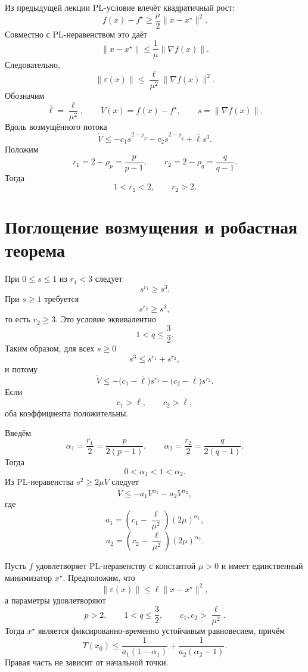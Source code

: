 Из предыдущей лекции PL-условие влечёт квадратичный рост:
\[
    f(x)-f^\star
    \ge
    \frac\mu2\lVert x-x^\star\rVert^2.
\]
Совместно с PL-неравенством это даёт
\[
    \lVert x-x^\star\rVert
    \le
    \frac1\mu\lVert\nabla f(x)\rVert.
\]
Следовательно,
\[
    \lVert\varepsilon(x)\rVert
    \le
    \frac\ell{\mu^2}
    \lVert\nabla f(x)\rVert^2.
\]
Обозначим
\[
    \overline\ell=\frac\ell{\mu^2},
    \qquad
    V(x)=f(x)-f^\star,
    \qquad
    s=\lVert\nabla f(x)\rVert.
\]
Вдоль возмущённого потока
\[
    \dot V
    \le
    -c_1s^{2-\rho_p}
    -c_2s^{2-\rho_q}
    +\overline\ell s^3.
\]
Положим
\[
    r_1=2-\rho_p=\frac{p}{p-1},
    \qquad
    r_2=2-\rho_q=\frac{q}{q-1}.
\]
Тогда
\[
    1<r_1<2,
    \qquad
    r_2>2.
\]

\section{Поглощение возмущения и робастная теорема}

При \(0\le s\le1\) из \(r_1<3\) следует
\[
    s^{r_1}\ge s^3.
\]
При \(s\ge1\) требуется
\[
    s^{r_2}\ge s^3,
\]
то есть \(r_2\ge3\). Это условие эквивалентно
\[
    1<q\le\frac32.
\]
Таким образом, для всех \(s\ge0\)
\[
    s^3\le s^{r_1}+s^{r_2},
\]
и потому
\[
    \dot V
    \le
    -\bigl(c_1-\overline\ell\bigr)s^{r_1}
    -\bigl(c_2-\overline\ell\bigr)s^{r_2}.
\]
Если
\[
    c_1>\overline\ell,
    \qquad
    c_2>\overline\ell,
\]
оба коэффициента положительны.

Введём
\[
    \alpha_1=\frac{r_1}{2}=\frac{p}{2(p-1)},
    \qquad
    \alpha_2=\frac{r_2}{2}=\frac{q}{2(q-1)}.
\]
Тогда
\[
    0<\alpha_1<1<\alpha_2.
\]
Из PL-неравенства \(s^2\ge2\mu V\) следует
\[
    \dot V
    \le
    -a_1V^{\alpha_1}
    -a_2V^{\alpha_2},
\]
где
\[
    a_1
    =
    \left(c_1-\frac\ell{\mu^2}\right)
    (2\mu)^{\alpha_1},
\]
\[
    a_2
    =
    \left(c_2-\frac\ell{\mu^2}\right)
    (2\mu)^{\alpha_2}.
\]

\begin{theorem}
Пусть \(f\) удовлетворяет PL-неравенству с константой \(\mu>0\) и
имеет единственный минимизатор \(x^\star\). Предположим, что
\[
    \lVert\varepsilon(x)\rVert
    \le
    \ell\lVert x-x^\star\rVert^2,
\]
а параметры удовлетворяют
\[
    p>2,
    \qquad
    1<q\le\frac32,
    \qquad
    c_1,c_2>\frac\ell{\mu^2}.
\]
Тогда \(x^\star\) является фиксированно-временно устойчивым
равновесием, причём
\[
    T(x_0)
    \le
    \frac1{a_1(1-\alpha_1)}
    +
    \frac1{a_2(\alpha_2-1)}.
\]
Правая часть не зависит от начальной точки.
\end{theorem}

